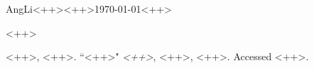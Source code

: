 \documentclass[12pt,a4paper,openany]{article}
\begin{document}
\begin{mla}{Ang}{Li}{<++>}{<++>}{\today}{<++>}

    <++>

\begin{workscited}
%
%
\bibent
    <++>, <++>. ``<++>" \textit{<++>}, <++>, <++>. Accessed <++>.
\end{workscited}

\end{mla}
\end{document}
